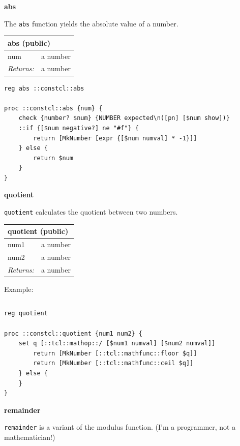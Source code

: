 \documentclass[twoside,9pt]{report}
\begin{document}
\textbf{abs}


The \texttt{abs} function yields the absolute value of a number.

\begin{tabular}{ |l l| }
\hline
\multicolumn{2}{|l|}{abs (public)} \\
\hline
num & a number \\
\textit{Returns:} & a number \\
\hline
\end{tabular}

\noindent\makebox[\linewidth]{\rule{\linewidth}{0.4pt}}
\begin{lstlisting}
reg abs ::constcl::abs
 
proc ::constcl::abs {num} {
    check {number? $num} {NUMBER expected\n([pn] [$num show])}
    ::if {[$num negative?] ne "#f"} {
        return [MkNumber [expr {[$num numval] * -1}]]
    } else {
        return $num
    }
}
\end{lstlisting}
\noindent\makebox[\linewidth]{\rule{\linewidth}{0.4pt}}

\textbf{quotient}


\texttt{quotient} calculates the quotient between two numbers.

\begin{tabular}{ |l l| }
\hline
\multicolumn{2}{|l|}{quotient (public)} \\
\hline
num1 & a number \\
num2 & a number \\
\textit{Returns:} & a number \\
\hline
\end{tabular}


Example:

\noindent\makebox[\linewidth]{\rule{\linewidth}{0.4pt}}
\begin{lstlisting}
\end{lstlisting}
\noindent\makebox[\linewidth]{\rule{\linewidth}{0.4pt}}
\noindent\makebox[\linewidth]{\rule{\linewidth}{0.4pt}}
\begin{lstlisting}
reg quotient
 
proc ::constcl::quotient {num1 num2} {
    set q [::tcl::mathop::/ [$num1 numval] [$num2 numval]]
        return [MkNumber [::tcl::mathfunc::floor $q]]
        return [MkNumber [::tcl::mathfunc::ceil $q]]
    } else {
    }
}
\end{lstlisting}
\noindent\makebox[\linewidth]{\rule{\linewidth}{0.4pt}}

\textbf{remainder}


\texttt{remainder} is a variant of the modulus function. (I'm a programmer, not a mathematician!)
\end{document}
